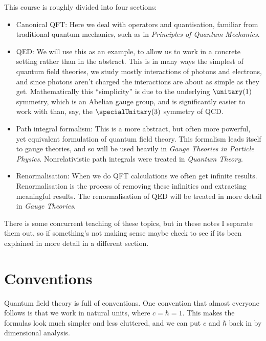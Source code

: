 \documentclass[fleqn]{NotesClass}
\newcommand*{\course}[1]{\textit{#1}}
\begin{document}
    This course is roughly divided into four sections:
    \begin{itemize}
        \item Canonical QFT: Here we deal with operators and quantisation, familiar from traditional quantum mechanics, such as in \course{Principles of Quantum Mechanics}.
        \item QED: We will use this as an example, to allow us to work in a concrete setting rather than in the abstract.
        This is in many ways the simplest of quantum field theories, we study mostly interactions of photons and electrons, and since photons aren't charged the interactions are about as simple as they get.
        Mathematically this \enquote{simplicity} is due to the underlying \(\unitary(1)\) symmetry, which is an Abelian gauge group, and is significantly easier to work with than, say, the \(\specialUnitary(3)\) symmetry of QCD.
        \item Path integral formalism: This is a more abstract, but often more powerful, yet equivalent formulation of quantum field theory.
        This formalism leads itself to gauge theories, and so will be used heavily in \course{Gauge Theories in Particle Physics}.
        Nonrelativistic path integrals were treated in \course{Quantum Theory}.
        \item Renormalisation: When we do QFT calculations we often get infinite results.
        Renormalisation is the process of removing these infinities and extracting meaningful results.
        The renormalisation of QED will be treated in more detail in \course{Gauge Theories}.
    \end{itemize}
    There is some concurrent teaching of these topics, but in these notes I separate them out, so if something's not making sense maybe check to see if its been explained in more detail in a different section.
    
    \section{Conventions}
    Quantum field theory is full of conventions.
    One convention that almost everyone follows is that we work in natural units, where \(c = \hbar = 1\).
    This makes the formulas look much simpler and less cluttered, and we can put \(c\) and \(\hbar\) back in by dimensional analysis.
    
\end{document}
